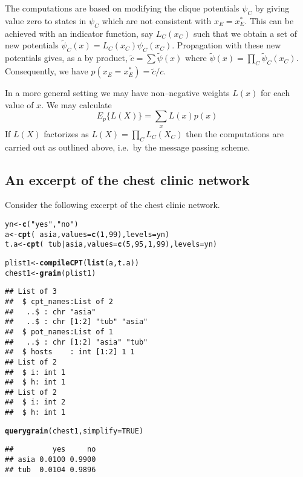 \documentclass[10pt]{article}\usepackage[]{graphicx}\usepackage[]{xcolor}
\makeatletter
\newcommand{\hlnum}[1]{\textcolor[rgb]{0.686,0.059,0.569}{#1}}%
\newcommand{\hlstr}[1]{\textcolor[rgb]{0.192,0.494,0.8}{#1}}%
\newcommand{\hlopt}[1]{\textcolor[rgb]{0,0,0}{#1}}%
\newcommand{\hlstd}[1]{\textcolor[rgb]{0.345,0.345,0.345}{#1}}%
\newcommand{\hlkwb}[1]{\textcolor[rgb]{0.69,0.353,0.396}{#1}}%
\newcommand{\hlkwc}[1]{\textcolor[rgb]{0.333,0.667,0.333}{#1}}%
\newcommand{\hlkwd}[1]{\textcolor[rgb]{0.737,0.353,0.396}{\textbf{#1}}}%
\newenvironment{kframe}{%
 \def\at@end@of@kframe{}%
 \ifinner\ifhmode%
  \def\at@end@of@kframe{\end{minipage}}%
  \begin{minipage}{\columnwidth}%
 \fi\fi%
 \def\FrameCommand##1{\hskip\@totalleftmargin \hskip-\fboxsep
 \colorbox{shadecolor}{##1}\hskip-\fboxsep
     \hskip-\linewidth \hskip-\@totalleftmargin \hskip\columnwidth}%
 \MakeFramed {\advance\hsize-\width
   \@totalleftmargin\z@ \linewidth\hsize
   \@setminipage}}%
 {\par\unskip\endMakeFramed%
 \at@end@of@kframe}
\newenvironment{knitrout}{}{} %
\makeatother
\begin{document}
The computations are based on modifying the clique potentials $\psi_C$
by giving value zero to states in $\psi_C$ which are not consistent
with $x_E=x^*_E$. This can be achieved with an indicator function, say
$L_C(x_C)$ such that we obtain a set of new potentials $\tilde \psi_C(x)
= L_C(x_C) \psi_C(x_C)$. Propagation with these new potentials gives,
as a by product, $\tilde c=\sum \tilde \psi(x)$ where
$\tilde\psi(x)= \prod_C \tilde\psi_C(x_C)$. Consequently, we have
$p(x_E=x^*_E)=\tilde c / c$.

In a more general setting we may have non--negative weights $L(x)$ for
each value of $x$. We may calculate
\begin{displaymath}
  E_p\{L(X)\} = \sum_x L(x)p(x)
\end{displaymath}
If $L(X)$ factorizes as $L(X)= \prod_C L_C(X_C)$ then the computations are
carried out as outlined above, i.e.\ by the message passing scheme.




\subsection{An excerpt of the chest clinic network}
\label{sec:an-excerpt-chest}


Consider the following excerpt of the chest clinic network.

\begin{knitrout}
\color{fgcolor}\begin{kframe}
\begin{alltt}
\hlstd{yn} \hlkwb{<-} \hlkwd{c}\hlstd{(}\hlstr{"yes"}\hlstd{,} \hlstr{"no"}\hlstd{)}
\hlstd{a}    \hlkwb{<-} \hlkwd{cpt}\hlstd{(}\hlopt{~}\hlstd{asia,} \hlkwc{values}\hlstd{=}\hlkwd{c}\hlstd{(}\hlnum{1}\hlstd{,} \hlnum{99}\hlstd{),} \hlkwc{levels}\hlstd{=yn)}
\hlstd{t.a}  \hlkwb{<-} \hlkwd{cpt}\hlstd{(}\hlopt{~}\hlstd{tub}\hlopt{|}\hlstd{asia,} \hlkwc{values}\hlstd{=}\hlkwd{c}\hlstd{(}\hlnum{5}\hlstd{,} \hlnum{95}\hlstd{,} \hlnum{1}\hlstd{,} \hlnum{99}\hlstd{),} \hlkwc{levels}\hlstd{=yn)}

\hlstd{plist1} \hlkwb{<-} \hlkwd{compileCPT}\hlstd{(}\hlkwd{list}\hlstd{(a, t.a))}
\hlstd{chest1} \hlkwb{<-} \hlkwd{grain}\hlstd{(plist1)}
\end{alltt}
\begin{verbatim}
## List of 3
##  $ cpt_names:List of 2
##   ..$ : chr "asia"
##   ..$ : chr [1:2] "tub" "asia"
##  $ pot_names:List of 1
##   ..$ : chr [1:2] "asia" "tub"
##  $ hosts    : int [1:2] 1 1
## List of 2
##  $ i: int 1
##  $ h: int 1
## List of 2
##  $ i: int 2
##  $ h: int 1
\end{verbatim}
\begin{alltt}
\hlkwd{querygrain}\hlstd{(chest1,} \hlkwc{simplify} \hlstd{=} \hlnum{TRUE}\hlstd{)}
\end{alltt}
\begin{verbatim}
##         yes     no
## asia 0.0100 0.9900
## tub  0.0104 0.9896
\end{verbatim}
\end{kframe}
\end{knitrout}
\end{document}
